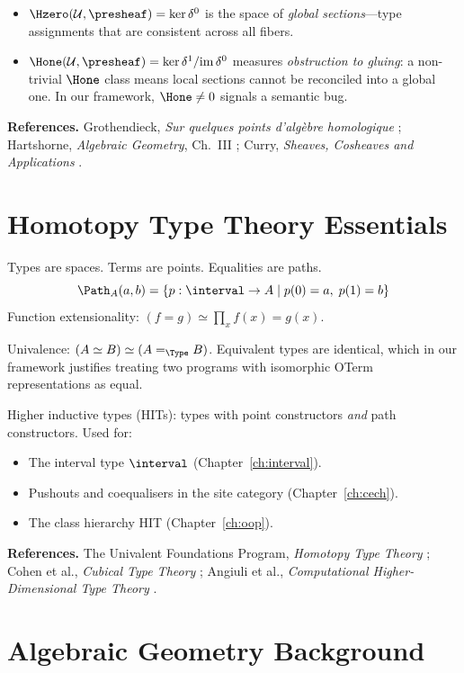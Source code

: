 \begin{itemize}
  \item $\Hzero(\mathcal{U}, \presheaf) = \ker \delta^0$ is the space of
    \emph{global sections}---type assignments that are consistent
    across all fibers.
  \item $\Hone(\mathcal{U}, \presheaf) = \ker \delta^1 / \mathrm{im}\, \delta^0$
    measures \emph{obstruction to gluing}: a non-trivial $\Hone$ class
    means local sections cannot be reconciled into a global one.
    In our framework, $\Hone \neq 0$ signals a semantic bug.
\end{itemize}

\noindent
\textbf{References.}
Grothendieck, \emph{Sur quelques points d'alg\`ebre homologique}
\cite{grothendieck1957};
Hartshorne, \emph{Algebraic Geometry}, Ch.~III \cite{hartshorne1977};
Curry, \emph{Sheaves, Cosheaves and Applications} \cite{curry2014}.

\section{Homotopy Type Theory Essentials}

Types are spaces.  Terms are points.  Equalities are paths.
\[
  \Path_A(a, b) = \{p : \interval \to A \mid p(0) = a,\; p(1) = b\}
\]
Function extensionality: $(f = g) \simeq \prod_x f(x) = g(x)$.

\noindent
Univalence: $(A \simeq B) \simeq (A =_\Type B)$.  Equivalent types
are identical, which in our framework justifies treating two programs
with isomorphic OTerm representations as equal.

\noindent
Higher inductive types (HITs): types with point constructors \emph{and}
path constructors.  Used for:
\begin{itemize}
  \item The interval type $\interval$ (Chapter~\ref{ch:interval}).
  \item Pushouts and coequalisers in the site category
    (Chapter~\ref{ch:cech}).
  \item The class hierarchy HIT (Chapter~\ref{ch:oop}).
\end{itemize}

\noindent
\textbf{References.}
The Univalent Foundations Program, \emph{Homotopy Type Theory} \cite{hott};
Cohen et al., \emph{Cubical Type Theory} \cite{cohen2018};
Angiuli et al., \emph{Computational Higher-Dimensional Type Theory}
\cite{angiuli2018}.

\section{Algebraic Geometry Background}


